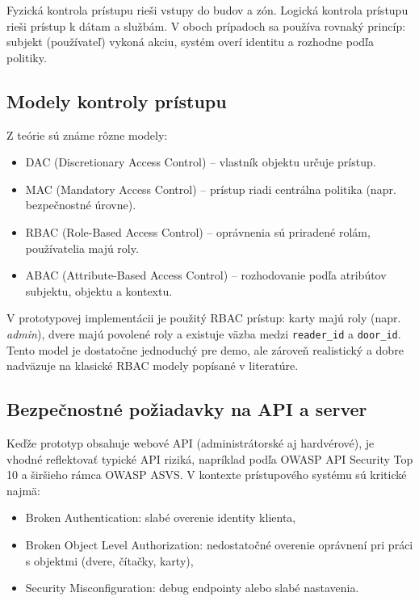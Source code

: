 \documentclass[journal,a4paper,onecolumn]{IEEEtran}
\begin{document}
Fyzická kontrola prístupu rieši vstupy do budov a zón. Logická kontrola prístupu rieši prístup k dátam a službám. V oboch prípadoch sa používa rovnaký princíp: subjekt (používateľ) vykoná akciu, systém overí identitu a rozhodne podľa politiky.\cite{NISTRBACModel}

\subsection{Modely kontroly prístupu}

Z teórie sú známe rôzne modely:

\begin{itemize}[leftmargin=*,itemsep=2pt]
  \item DAC (Discretionary Access Control) -- vlastník objektu určuje prístup.
  \item MAC (Mandatory Access Control) -- prístup riadi centrálna politika (napr. bezpečnostné úrovne).
  \item RBAC (Role-Based Access Control) -- oprávnenia sú priradené rolám, používatelia majú roly.
  \item ABAC (Attribute-Based Access Control) -- rozhodovanie podľa atribútov subjektu, objektu a kontextu.
\end{itemize}

V prototypovej implementácii je použitý RBAC prístup: karty majú roly (napr. \emph{admin}), dvere majú povolené roly a existuje väzba medzi \texttt{reader\_id} a \texttt{door\_id}. Tento model je dostatočne jednoduchý pre demo, ale zároveň realistický a dobre nadväzuje na klasické RBAC modely popísané v literatúre.\cite{NISTRBACModel,SandhuRBAC1996}

\subsection{Bezpečnostné požiadavky na API a server}

Keďže prototyp obsahuje webové API (administrátorské aj hardvérové), je vhodné reflektovať typické API riziká, napríklad podľa OWASP API Security Top 10 a širšieho rámca OWASP ASVS.\cite{OWASPAPI2023,OWASPASVS} V kontexte prístupového systému sú kritické najmä:

\begin{itemize}[leftmargin=*,itemsep=2pt]
  \item Broken Authentication: slabé overenie identity klienta,
  \item Broken Object Level Authorization: nedostatočné overenie oprávnení pri práci s objektmi (dvere, čítačky, karty),
  \item Security Misconfiguration: debug endpointy alebo slabé nastavenia.
\end{itemize}
\end{document}
